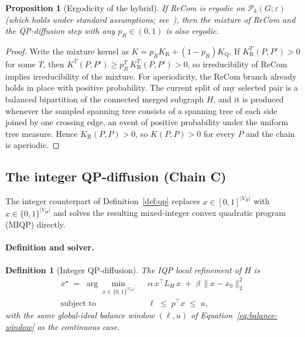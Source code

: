 \documentclass[11pt]{article}
\newtheorem{proposition}{Proposition}[section]
\newtheorem{definition}{Definition}[section]
\begin{document}
\begin{proposition}[Ergodicity of the hybrid]\label{prop:ergodic}
If ReCom is ergodic on $\mathcal{P}_k(G; \varepsilon)$ (which holds
under standard assumptions; see~\cite{deford2021recombination,
cannon2024irreducibility}), then the mixture of ReCom and
the QP-diffusion step with any $p_R \in (0, 1)$ is also ergodic.
\end{proposition}

\begin{proof}
Write the mixture kernel as $K = p_R K_{\mathrm{R}} +
(1 - p_R) K_{\mathrm{Q}}$. If $K_{\mathrm{R}}^{T}(P, P') > 0$ for
some $T$, then $K^{T}(P, P') \ge p_R^{T}\, K_{\mathrm{R}}^{T}(P, P')
> 0$, so irreducibility of ReCom implies irreducibility of the
mixture. For aperiodicity, the ReCom branch already holds in place
with positive probability. The current split of any selected pair is
a balanced bipartition of the connected merged subgraph $H$, and it
is produced whenever the sampled spanning tree consists of a spanning
tree of each side joined by one crossing edge, an event of positive
probability under the uniform tree measure. Hence
$K_{\mathrm{R}}(P, P) > 0$, so $K(P, P) > 0$ for every $P$ and the
chain is aperiodic.
\end{proof}

\subsection{The integer QP-diffusion (Chain C)}\label{sec:iqp}

The integer counterpart of Definition~\ref{def:qp} replaces
$x \in [0,1]^{|V_H|}$ with $x \in \{0, 1\}^{|V_H|}$ and solves the
resulting mixed-integer convex quadratic program (MIQP) directly.

\paragraph{Definition and solver.}\label{sec:iqp-def}

\begin{definition}[Integer QP-diffusion]\label{def:iqp}
The IQP local refinement of $H$ is
\begin{align}
  x^\star \;=\; \arg\min_{x \in \{0,1\}^{|V_H|}} \;\;
    & \alpha\, x^\top L_H\, x \;+\; \beta\, \|x - x_0\|_2^2 \label{eq:iqp-obj} \\
  \text{subject to} \;\;
    & \ell \;\le\; p^\top x \;\le\; u,
\end{align}
with the same global-ideal balance window $(\ell, u)$ of
Equation~\eqref{eq:balance-window} as the continuous case.
\end{definition}
\end{document}
